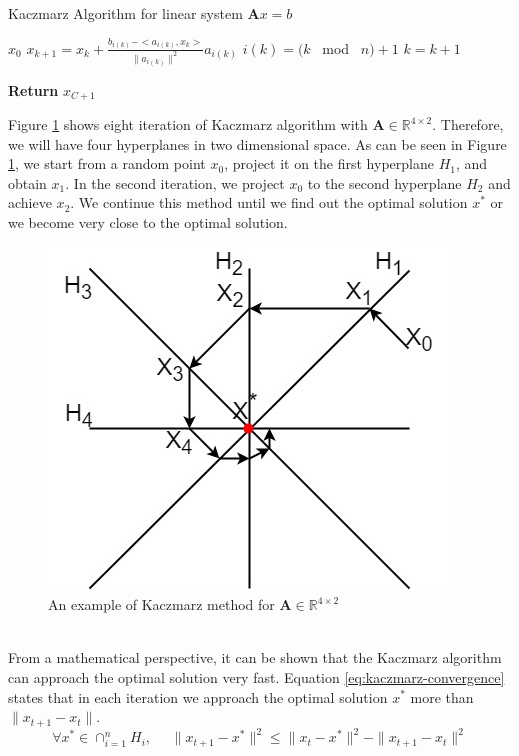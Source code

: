 \begin{algorithm} 
\caption{Kaczmarz Algorithm for linear system $\mathbf{A}x=b$}\label{alg:Kaczmarz}
\begin{algorithmic}[1]
\Require $x_{0}$   
        \State	$x_{k+1}=x_{k}+\frac{b_{i(k)}-<a_{i(k)},x_{k}>}{\| a_{i(k)}\|^2}a_{i(k)}$
        \State	$i(k)=(k $~ mod ~$n)+1$
        \State	$k=k+1$
\EndWhile
\end{algorithmic}
\textbf{Return} $x_{C+1}$
\end{algorithm}
Figure \ref{fig:kaczmarz} shows eight iteration of Kaczmarz algorithm with $\mathbf{A} \in \mathds{R}^{4 \times 2}$. Therefore, we will have four hyperplanes in two dimensional space. As can be seen in Figure \ref{fig:kaczmarz}, we start from a random point $x_0$, project it on the first hyperplane $H_1$, and obtain $x_1$. In the second iteration, we project $x_0$ to the second hyperplane $H_2$ and achieve $x_2$. We continue this method until we find out the optimal solution $x^*$ or we become very close to the optimal solution.
\begin{figure}[!h]
    \centering
    \includegraphics[scale=0.4]{Images/GeometricInterpretation/kacmarz_algorithm.jpg}
    \caption{An example of Kaczmarz method for $\mathbf{A} \in \mathds{R}^{4 \times 2}$}
    \label{fig:kaczmarz}
\end{figure}\\
From a mathematical perspective, it can be shown that the Kaczmarz algorithm can approach the optimal solution very fast. Equation \ref{eq:kaczmarz-convergence} states that in each iteration we approach the optimal solution $x^*$ more than $\|x_{t+1}-x_t\|$.
\begin{equation}
\label{eq:kaczmarz-convergence}
    \forall x^* \in \cap_{i=1}^n H_i,~~~~~~\|x_{t+1}-x^*\|^2 \leq \|x_{t}-x^*\|^2 - \|x_{t+1}-x_t\|^2
\end{equation}

